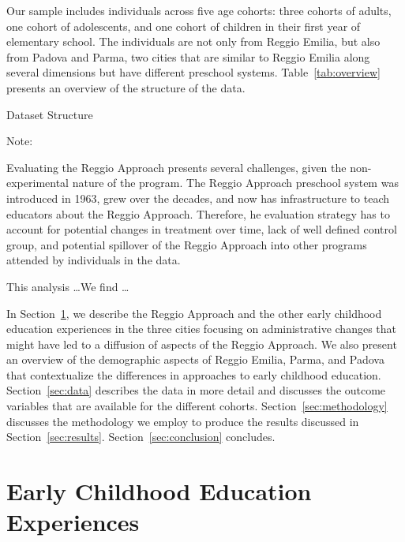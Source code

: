 Our sample includes individuals across five age cohorts: three cohorts of adults, one cohort of adolescents, and one cohort of children in their first year of elementary school. The individuals are not only from Reggio Emilia, but also from Padova and Parma, two cities that are similar to Reggio Emilia along several dimensions but have different preschool systems. Table~\ref{tab:overview} presents an overview of the structure of the data.

\begin{table}[H]
\centering
\begin{threeparttable}
\caption{Dataset Structure} \label{tab:overview}
	
\begin{tablenotes}
Note:
\end{tablenotes}
\end{threeparttable}
\end{table}

Evaluating the Reggio Approach presents several challenges, given the non-experimental nature of the program. The Reggio Approach preschool system was introduced in 1963, grew over the decades, and now has infrastructure to teach educators about the Reggio Approach. Therefore, he evaluation strategy has to account for potential changes in treatment over time, lack of well defined control group, and potential spillover of the Reggio Approach into other programs attended by individuals in the data. 

This analysis \ldots We find \ldots

In Section~\ref{sec:eceexperiences}, we describe the Reggio Approach and the other early childhood education experiences in the three cities focusing on administrative changes that might have led to a diffusion of aspects of the Reggio Approach. We also present an overview of the demographic aspects of Reggio Emilia, Parma, and Padova that contextualize the differences in approaches to early childhood education. Section~\ref{sec:data} describes the data in more detail and discusses the outcome variables that are available for the different cohorts. Section~\ref{sec:methodology} discusses the methodology we employ to produce the results discussed in Section~\ref{sec:results}. Section~\ref{sec:conclusion} concludes.

\section{Early Childhood Education Experiences}
\label{sec:eceexperiences}

